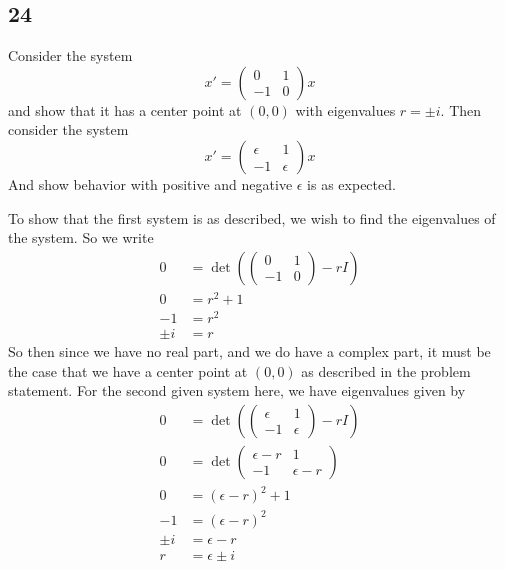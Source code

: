 \documentclass{article}
\theoremstyle{definition}
\begin{document}
    \subsection*{24}
        \begin{mdframed}[]
            Consider the system 
            \[
                x' = \begin{pmatrix}
                    0 & 1 \\ -1 & 0
                \end{pmatrix}x
            \]
            and show that it has a center point at $(0,0)$ with eigenvalues $r = \pm i$.
            Then consider the system 
            \[
                x' = \begin{pmatrix}
                    \epsilon & 1 \\
                    -1 & \epsilon
                \end{pmatrix}x
            \]
            And show behavior with positive and negative $\epsilon$ is as expected.
        \end{mdframed}
        To show that the first system is as described, we wish to find the eigenvalues of the system.
        So we write 
        \begin{align*}
            0 &= \det\left( \begin{pmatrix}
                0 & 1 \\
                -1 & 0
            \end{pmatrix}-rI\right)
            \\
            0&= r^2 + 1 \\
            -1 &= r^2 \\
            \pm i &= r
        \end{align*}
        So then since we have no real part, and we do have a complex part, it must be the case 
        that we have a center point at $(0,0)$ as described in the problem statement.
        For the second given system here, we have eigenvalues given by 
        \begin{align*}
            0 &=\det\left(\begin{pmatrix}
                \epsilon & 1 \\
                -1 & \epsilon
            \end{pmatrix} - rI\right) \\
            0 &= \det \begin{pmatrix}
                \epsilon - r & 1 \\
                -1 & \epsilon - r
            \end{pmatrix} \\
            0 &= (\epsilon - r)^2 + 1\\
            -1 &= (\epsilon - r)^2 \\
            \pm i &= \epsilon - r \\
            r &= \epsilon \pm i
        \end{align*}
\end{document}
